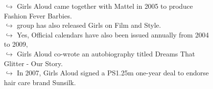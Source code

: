 \documentclass[11pt,a4paper, onecolumn]{article}
\begin{document}
\begin{figure}[t] \small \begin{tcolorbox}[boxsep=0pt,left=5pt,right=0pt,top=2pt,colback = yellow!5] \begin{dialogue}
 \small 
\colorbox{pink!25}{$\hookrightarrow$}
{ Girls Aloud came together with Mattel in 2005 to produce Fashion Fever Barbies. }
\\
\colorbox{pink!25}{$\hookrightarrow$}
{ group has also released Girls on Film and Style. }
\\
\colorbox{pink!25}{$\hookrightarrow$}
\colorbox{red!25}{Yes,}
{ Official calendars have also been issued annually from 2004 to 2009, }
\\
\colorbox{pink!25}{$\hookrightarrow$}
{ Girls Aloud co-wrote an autobiography titled Dreams That Glitter - Our Story. }
\\
\colorbox{pink!25}{$\hookrightarrow$}
{ In 2007, Girls Aloud signed a PS1.25m one-year deal to endorse hair care brand Sunsilk. }
\\
 \end{dialogue}\end{tcolorbox}\end{figure}
\end{document}
